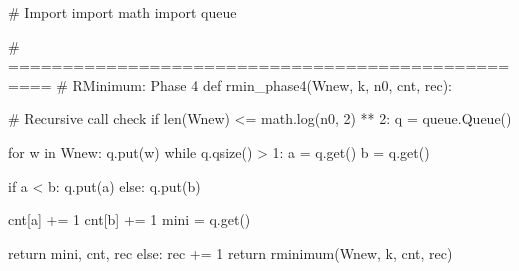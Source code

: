 \begin{python}
#   Import
import math
import queue

# ==================================================
#   RMinimum: Phase 4
def rmin_phase4(Wnew, k, n0, cnt, rec):

    # Recursive call check
    if len(Wnew) <= math.log(n0, 2) ** 2:
        q = queue.Queue()

        for w in Wnew:
            q.put(w)
        while q.qsize() > 1:
            a = q.get()
            b = q.get()

            if a < b:
                q.put(a)
            else:
                q.put(b)

            cnt[a] += 1
            cnt[b] += 1
        mini = q.get()

        return mini, cnt, rec
    else:
        rec += 1
        return rminimum(Wnew, k, cnt, rec)
\end{python}
